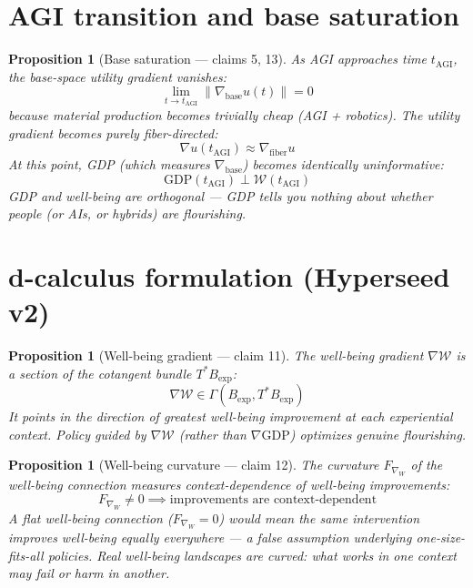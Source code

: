 \documentclass[11pt,a4paper]{article}
\newtheorem{proposition}[definition]{Proposition}
\begin{document}
\section{AGI transition and base saturation}

\begin{proposition}[Base saturation --- claims 5, 13]
\label{prop:saturation}
As AGI approaches time $t_{\text{AGI}}$, the base-space utility gradient
vanishes:
\[
  \lim_{t \to t_{\text{AGI}}} \|\nabla_{\text{base}} u(t)\| = 0
\]
because material production becomes trivially cheap (AGI + robotics).
The utility gradient becomes purely fiber-directed:
\[
  \nabla u(t_{\text{AGI}}) \approx \nabla_{\text{fiber}} u
\]
At this point, GDP (which measures $\nabla_{\text{base}}$) becomes
identically uninformative:
\[
  \text{GDP}(t_{\text{AGI}}) \perp \mathcal{W}(t_{\text{AGI}})
\]
GDP and well-being are orthogonal --- GDP tells you nothing about
whether people (or AIs, or hybrids) are flourishing.
\end{proposition}

\section{d-calculus formulation (Hyperseed v2)}

\begin{proposition}[Well-being gradient --- claim 11]
\label{prop:gradient}
The well-being gradient $\nabla \mathcal{W}$ is a section of the
cotangent bundle $T^*B_{\text{exp}}$:
\[
  \nabla \mathcal{W} \in \Gamma(B_{\text{exp}}, T^*B_{\text{exp}})
\]
It points in the direction of greatest well-being improvement at each
experiential context. Policy guided by $\nabla \mathcal{W}$ (rather
than $\nabla \text{GDP}$) optimizes genuine flourishing.
\end{proposition}

\begin{proposition}[Well-being curvature --- claim 12]
\label{prop:curvature}
The curvature $F_{\nabla_W}$ of the well-being connection measures
context-dependence of well-being improvements:
\[
  F_{\nabla_W} \neq 0 \implies \text{improvements are context-dependent}
\]
A flat well-being connection ($F_{\nabla_W} = 0$) would mean the same
intervention improves well-being equally everywhere --- a false
assumption underlying one-size-fits-all policies. Real well-being
landscapes are curved: what works in one context may fail or harm
in another.
\end{proposition}
\end{document}
